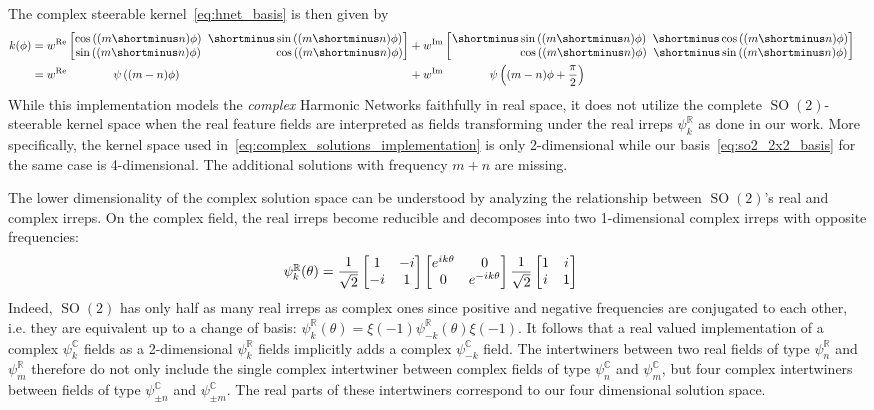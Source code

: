 \documentclass{article}
\newcommand{\lp}{\left(}
\newcommand{\rp}{\right)}
\DeclareMathOperator*{\R}{\mathbb{R}}
\DeclareMathOperator*{\Cm}{\mathbb{C}}
\newcommand{\SO}[1]{\ensuremath{\operatorname{SO}(#1)}}
\newcommand{\PSI}[1]{
	\begin{bmatrix}
		\cos\lp#1\rp & \!\!\!         \shortminus \sin\lp#1\rp \\
		\sin\lp#1\rp & \!\!\!\phantom{\shortminus}\cos\lp#1\rp \\
	\end{bmatrix}
}
\newcommand{\PSIP}[1]{
	\begin{bmatrix}
		         \shortminus \sin\lp#1\rp & \!\!\!         \shortminus \cos\lp#1\rp \\
		\phantom{\shortminus}\cos\lp#1\rp & \!\!\!         \shortminus \sin\lp#1\rp \\
	\end{bmatrix}
}
\begin{document}
The complex steerable kernel~\eqref{eq:hnet_basis} is then given by
\begin{align}\label{eq:complex_solutions_implementation}
    k(\phi) &= w^\text{Re} \PSI{(m \shortminus n)\phi}        \!\!\!\!\!\! &&+ w^\text{Im} \PSIP{(m \shortminus n)\phi} &&\nonumber\\
            &= w^\text{Re} \qquad\qquad \psi\lp (m-n)\phi \rp \!\!\!\!\!\! &&+ w^\text{Im} \qquad\qquad \psi \lp (m-n)\phi + {\pi\over2} \rp &&
\end{align}
While this implementation models the \textit{complex} Harmonic Networks faithfully in real space, it does not utilize the complete $\SO2$-steerable kernel space when the real feature fields are interpreted as fields transforming under the real irreps $\psi^{\R}_k$ as done in our work.
More specifically, the kernel space used in~\eqref{eq:complex_solutions_implementation} is only 2-dimensional while our basis~\eqref{eq:so2_2x2_basis} for the same case is 4-dimensional.
The additional solutions with frequency $m+n$ are missing.

The lower dimensionality of the complex solution space can be understood by analyzing the relationship between $\SO2$'s real and complex irreps.
On the complex field, the real irreps become reducible and decomposes into two 1-dimensional complex irreps with opposite frequencies:
\begin{align*}
    \psi^{\R}_k(\theta) &= 
    {1\over\sqrt{2}} 
    \begin{bmatrix} 1 & -i \\ -i & 1\end{bmatrix}
    \begin{bmatrix} e^{ik\theta} & 0 \\ 0 & e^{-ik\theta} \end{bmatrix}
    {1\over\sqrt{2}}
    \begin{bmatrix} 1 &  i \\  i & 1\end{bmatrix}
\end{align*}
Indeed, $\SO2$ has only half as many real irreps as complex ones since positive and negative frequencies are conjugated to each other, i.e. they are equivalent up to a change of basis: $\psi^{\R}_k(\theta) = \xi(-1)\psi^{\R}_{-k}(\theta)\xi(-1)$.
It follows that a real valued implementation of a complex $\psi^{\mathbb{C}}_k$ fields as a 2-dimensional $\psi^{\R}_k$ fields implicitly adds a complex $\psi^{\mathbb{C}}_{-k}$ field.
The intertwiners between two real fields of type $\psi^{\R}_n$ and $\psi^{\R}_m$ therefore do not only include the single complex intertwiner between complex fields of type $\psi^{\Cm}_n$ and $\psi^{\Cm}_m$, but four complex intertwiners between fields of type $\psi^{\Cm}_{\pm n}$ and $\psi^{\Cm}_{\pm m}$.
The real parts of these intertwiners correspond to our four dimensional solution space.
\end{document}
